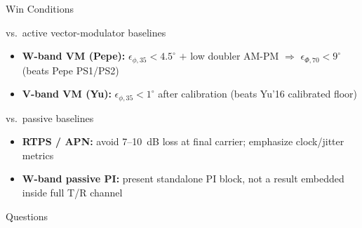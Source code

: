 \documentclass[10pt, aspectratio=169]{beamer}
\begin{document}
\begin{frame}{Win Conditions}
\begin{alertblock}{vs.\ active vector-modulator baselines}
\begin{itemize}
  \item \textbf{W-band VM (Pepe):}
    $\epsilon_{\phi,35} < 4.5^\circ$ $+$ low doubler AM-PM
    $\Rightarrow$ $\epsilon_{\Phi,70} < 9^\circ$ (beats Pepe PS1/PS2)
  \item \textbf{V-band VM (Yu):}
    $\epsilon_{\phi,35} < 1^\circ$ after calibration
    (beats Yu'16 calibrated floor)
\end{itemize}
\end{alertblock}
\begin{exampleblock}{vs.\ passive baselines}
\begin{itemize}
  \item \textbf{RTPS / APN:}
    avoid 7--10~dB loss at final carrier; emphasize clock/jitter metrics
  \item \textbf{W-band passive PI:}
    present standalone PI block, not a result embedded inside full T/R channel
\end{itemize}
\end{exampleblock}
\end{frame}

\begin{frame}[standout]
Questions
\end{frame}
\end{document}
